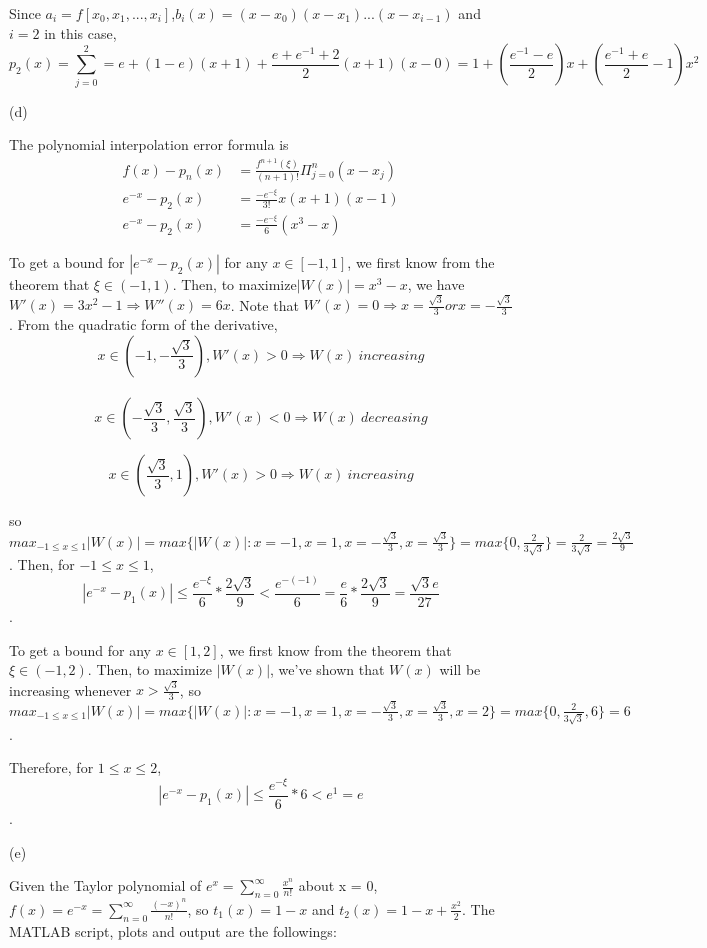 \documentclass[12pt]{article}
\begin{document}
Since $a_i=f[x_0,x_1,...,x_i]$,$b_i(x)=(x-x_0)(x-x_1)...(x-x_{i-1})$ and $i=2$ in this case, $$p_2(x)=\sum_{j=0}^{2}=e+(1-e)(x+1)+\frac{e+e^{-1}+2}{2}(x+1)(x-0)=1+(\frac{e^{-1}-e}{2})x+(\frac{e^{-1}+e}{2}-1)x^2$$

(d)

The polynomial interpolation error formula is 
\begin{equation}
\begin{aligned}
f(x)-p_n(x) &=\frac{f^{n+1}(\xi)}{(n+1)!}\Pi_{j=0}^n(x-x_j)\\
e^{-x}-p_2(x) &=\frac{-e^{-\xi}}{3!}x(x+1)(x-1) \\
e^{-x} - p_2(x) &= \frac{-e^{-\xi}}{6}(x^3-x)
\nonumber
\end{aligned}
\end{equation}

To get a bound for $|e^{-x}-p_2(x)|$ for any $x \in [-1,1]$, we first know from the theorem that \textbf{$\xi \in (-1,1)$}. Then, to maximize$|W(x)|=x^3-x$, we have $W'(x)=3x^2-1 \Rightarrow W''(x)=6x$. Note that $W'(x)=0 \Rightarrow x= \frac{\sqrt{3}}{3} or x = -\frac{\sqrt{3}}{3}$. From the quadratic form of the derivative, $$x \in (-1,-\frac{\sqrt{3}}{3}),W'(x)>0 \Rightarrow W(x) \ increasing$$\\ $$x \in (-\frac{\sqrt{3}}{3},\frac{\sqrt{3}}{3}),W'(x)<0 \Rightarrow W(x) \ decreasing$$

$$x \in (\frac{\sqrt{3}}{3},1),W'(x)>0 \Rightarrow W(x) \ increasing$$ 

so $max_{-1\leq x \leq 1}|W(x)|=max \{|W(x)|: x=-1,x=1,x= -\frac{\sqrt{3}}{3}, x=\frac{\sqrt{3}}{3} \}=max \{ 0,\frac{2}{3\sqrt{3}} \}=\frac{2}{3\sqrt{3}}=\frac{2\sqrt{3}}{9}$. Then, for $-1 \leq x \leq 1$, $$|e^{-x}-p_1(x)| \leq \frac{e^{-\xi}}{6}*\frac{2\sqrt{3}}{9}<\frac{e^{-(-1)}}{6}=\frac{e}{6}*\frac{2\sqrt{3}}{9}=\frac{\sqrt{3}e}{27}$$.

To get a bound for any $x\in [1,2]$, we first know from the theorem that $\xi \in (-1,2)$. Then, to maximize $|W(x)|$, we've shown that $W(x)$ will be increasing whenever $x> \frac{\sqrt{3}}{3}$, so $max_{-1\leq x \leq 1}|W(x)|=max \{|W(x)|: x=-1,x=1,x= -\frac{\sqrt{3}}{3}, x=\frac{\sqrt{3}}{3} ,x=2 \}=max \{ 0,\frac{2}{3\sqrt{3}},6 \}=6$.

Therefore, for $1 \leq x \leq 2$,$$|e^{-x}-p_1(x)| \leq \frac{e^{-\xi}}{6}*6<e^{1}=e$$ .

(e)

Given the Taylor polynomial of $e^x = \sum_{n=0}^{\infty}\frac{x^n}{n!}$ about x = 0, $f(x)=e^{-x}=\sum_{n=0}^{\infty}\frac{(-x)^n}{n!}$, so $t_1(x)=1-x$ and $t_2(x)=1-x+\frac{x^2}{2}$. The MATLAB script, plots and output are the followings:
\end{document}
